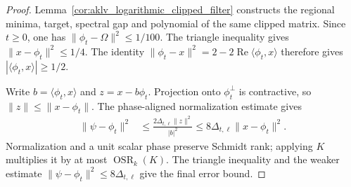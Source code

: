 \begin{proof}
    \leanok
    Lemma~\ref{cor:aklv_logarithmic_clipped_filter} constructs the
    regional minima, target, spectral gap and polynomial of the same
    clipped matrix. Since $t\ge0$, one has
    $\|\phi_t-\Omega\|^2\le1/100$. The triangle inequality gives
    $\|x-\phi_t\|^2\le1/4$. The identity
    $\|\phi_t-x\|^2=2-2\operatorname{Re}\langle\phi_t,x\rangle$
    therefore gives $|\langle\phi_t,x\rangle|\ge1/2$.

    Write $b=\langle\phi_t,x\rangle$ and $z=x-b\phi_t$.
    Projection onto $\phi_t^\perp$ is contractive, so
    $\|z\|\le\|x-\phi_t\|$. The phase-aligned normalization estimate
    gives
    \begin{align*}
        \|\psi-\phi_t\|^2
         & \le\frac{2\Delta_{t,\ell}\|z\|^2}{|b|^2}
        \le8\Delta_{t,\ell}\|x-\phi_t\|^2.
    \end{align*}
    Normalization and a unit scalar phase preserve Schmidt rank; applying
    $K$ multiplies it by at most $\operatorname{OSR}_k(K)$.
    The triangle inequality and the weaker estimate
    $\|\psi-\phi_t\|^2\le8\Delta_{t,\ell}$ give the final error bound.
\end{proof}

